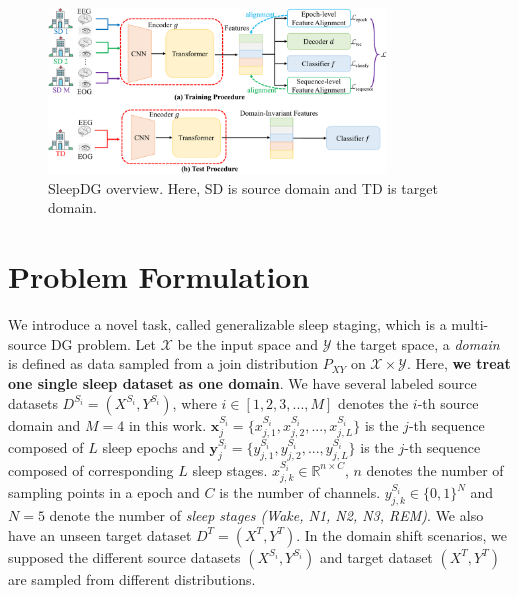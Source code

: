 \documentclass[letterpaper]{article} %
\begin{document}
	\begin{figure}[tb]
		\centering
		\small
		\includegraphics[width=0.8\textwidth]{model}
		\caption{SleepDG overview. Here, SD is source domain and TD is target domain.}
		\label{fig:model}
	\end{figure}
	
	\section{Problem Formulation}
	We introduce a novel task, called generalizable sleep staging, which is a multi-source DG problem.
	Let $\mathcal{X}$ be the input space and $\mathcal{Y}$ the target space, a \textit{domain} is defined as data sampled from a join distribution $P_{XY}$ on $\mathcal{X} \times \mathcal{Y}$.
	Here, \textbf{we treat one single sleep dataset as one domain}.
	We have several labeled source datasets $D^{S_i}=(X^{S_i}, Y^{S_i})$, where $i \in [1, 2, 3,..., M]$ denotes the $i$-th source domain and $M=4$ in this work.
	$\mathrm{\mathbf{x}}^{S_i}_j = \{x^{S_i}_{j, 1}, x^{S_i}_{j, 2}, ... , x^{S_i}_{j, L}\}$ is the $j$-th  sequence composed of $L$ sleep epochs and $\mathrm{\mathbf{y}}^{S_i}_j = \{y^{S_i}_{j, 1}, y^{S_i}_{j, 2}, ... , y^{S_i}_{j, L}\}$ is the $j$-th sequence composed of corresponding $L$ sleep stages.
	$x^{S_i}_{j, k} \in \mathbb{R}^{n \times C}$, $n$ denotes the number of sampling points in a epoch and $C$ is the number of channels.
	$y^{S_i}_{j, k} \in \{0, 1\}^N$ and $N=5$ denote the number of \textit{sleep stages (Wake, N1, N2, N3, REM)}.
	We also have an unseen target dataset $D^T=(X^T, Y^T)$. 
	In the domain shift scenarios, we supposed the different source datasets $(X^{S_i}, Y^{S_i})$ and target dataset $(X^T, Y^T)$ are sampled from different distributions.
	
\end{document}
